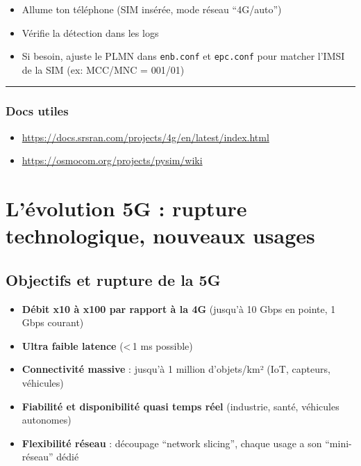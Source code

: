\documentclass[
  french,
]{article}
\providecommand{\tightlist}{%
  \setlength{\itemsep}{0pt}\setlength{\parskip}{0pt}}
\begin{document}
\begin{itemize}
\tightlist
\item
  Allume ton téléphone (SIM insérée, mode réseau ``4G/auto'')
\item
  Vérifie la détection dans les logs
\item
  Si besoin, ajuste le PLMN dans \texttt{enb.conf} et \texttt{epc.conf}
  pour matcher l'IMSI de la SIM (ex: MCC/MNC = 001/01)
\end{itemize}

\begin{center}\rule{0.5\linewidth}{0.5pt}\end{center}

\subsubsection{Docs utiles}\label{docs-utiles}

\begin{itemize}
\tightlist
\item
  \url{https://docs.srsran.com/projects/4g/en/latest/index.html}
\item
  \url{https://osmocom.org/projects/pysim/wiki}
\end{itemize}

\section{L'évolution 5G : rupture technologique, nouveaux
usages}\label{luxe9volution-5g-rupture-technologique-nouveaux-usages}

\subsection{Objectifs et rupture de la
5G}\label{objectifs-et-rupture-de-la-5g}

\begin{itemize}
\tightlist
\item
  \textbf{Débit x10 à x100 par rapport à la 4G} (jusqu'à 10 Gbps en
  pointe, 1 Gbps courant)
\item
  \textbf{Ultra faible latence} (\textless\,1 ms possible)
\item
  \textbf{Connectivité massive} : jusqu'à 1 million d'objets/km² (IoT,
  capteurs, véhicules)
\item
  \textbf{Fiabilité et disponibilité quasi temps réel} (industrie,
  santé, véhicules autonomes)
\item
  \textbf{Flexibilité réseau} : découpage ``network slicing'', chaque
  usage a son ``mini-réseau'' dédié
\end{itemize}
\end{document}
